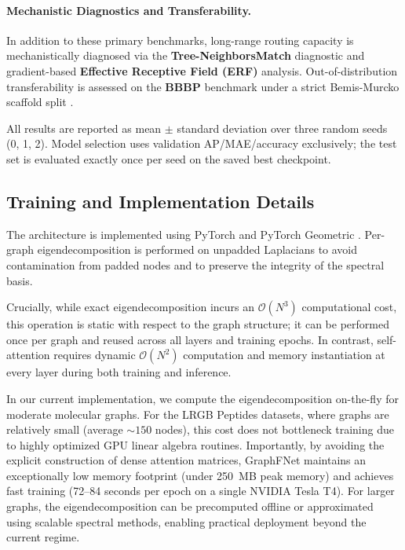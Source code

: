 \documentclass[10pt]{article}
\begin{document}
\paragraph{Mechanistic Diagnostics and Transferability.} In addition to these primary benchmarks, long-range routing capacity is mechanistically diagnosed via the \textbf{Tree-NeighborsMatch} diagnostic \citep{alon2021bottleneck} and gradient-based \textbf{Effective Receptive Field (ERF)} analysis. Out-of-distribution transferability is assessed on the \textbf{BBBP} benchmark under a strict Bemis-Murcko scaffold split \citep{wu2018moleculenet}.

All results are reported as mean $\pm$ standard deviation over three random seeds (0, 1, 2). Model selection uses validation AP/MAE/accuracy exclusively; the test set is evaluated exactly once per seed on the saved best checkpoint.

\subsection{Training and Implementation Details}

The architecture is implemented using PyTorch and PyTorch Geometric \citep{fey2019fast}. Per-graph eigendecomposition is performed on unpadded Laplacians to avoid contamination from padded nodes and to preserve the integrity of the spectral basis. 

Crucially, while exact eigendecomposition incurs an $\mathcal{O}(N^3)$ computational cost, this operation is static with respect to the graph structure; it can be performed once per graph and reused across all layers and training epochs. In contrast, self-attention requires dynamic $\mathcal{O}(N^2)$ computation and memory instantiation at every layer during both training and inference.

In our current implementation, we compute the eigendecomposition on-the-fly for moderate molecular graphs. For the LRGB Peptides datasets, where graphs are relatively small (average ${\sim}150$ nodes), this cost does not bottleneck training due to highly optimized GPU linear algebra routines. Importantly, by avoiding the explicit construction of dense attention matrices, GraphFNet maintains an exceptionally low memory footprint (under 250~MB peak memory) and achieves fast training (72--84 seconds per epoch on a single NVIDIA Tesla T4). For larger graphs, the eigendecomposition can be precomputed offline or approximated using scalable spectral methods, enabling practical deployment beyond the current regime.
\end{document}
